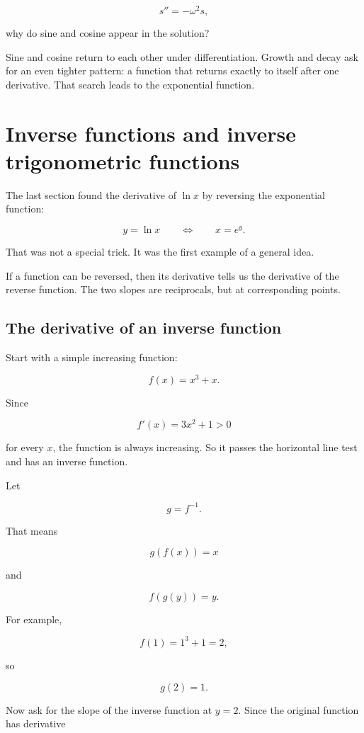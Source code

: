 \[
s''=-\omega^2s,
\]

why do sine and cosine appear in the solution?

Sine and cosine return to each other under differentiation. Growth and decay ask
for an even tighter pattern: a function that returns exactly to itself after one
derivative. That search leads to the exponential function.
\section{Inverse functions and inverse trigonometric functions}
\label{sec:inverse-functions-inverse-trig}

The last section found the derivative of \(\ln x\) by reversing the exponential function:

\[
y=\ln x
\qquad\Longleftrightarrow\qquad
x=e^y.
\]

That was not a special trick.  It was the first example of a general idea.

If a function can be reversed, then its derivative tells us the derivative of the reverse function.  The two slopes are reciprocals, but at corresponding points.

\subsection{The derivative of an inverse function}
\label{subsec:derivative-inverse-function}

Start with a simple increasing function:

\[
f(x)=x^3+x.
\]

Since

\[
f'(x)=3x^2+1>0
\]

for every \(x\), the function is always increasing.  So it passes the horizontal line test and has an inverse function.

Let

\[
g=f^{-1}.
\]

That means

\[
g(f(x))=x
\]

and

\[
f(g(y))=y.
\]

For example,

\[
f(1)=1^3+1=2,
\]

so

\[
g(2)=1.
\]

Now ask for the slope of the inverse function at \(y=2\).  Since the original function has derivative

